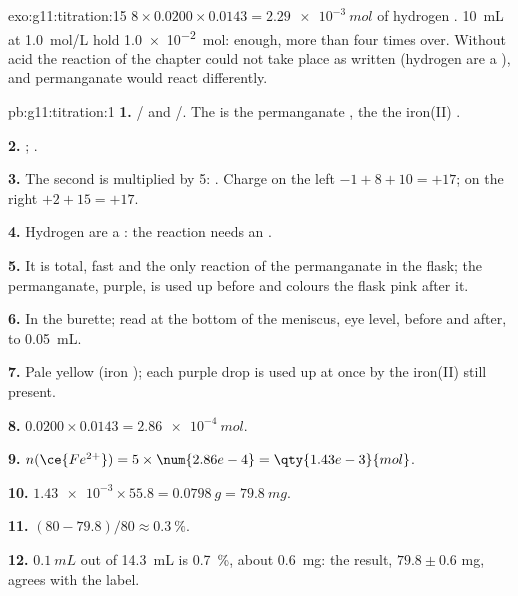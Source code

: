\begin{solution}{exo:g11:titration:15}
$8 \times 0.0200 \times 0.0143 = \qty{2.29e-3}{mol}$ of hydrogen .
\qty{10}{mL} at \qty{1.0}{mol/L} hold \qty{1.0e-2}{mol}: enough, more
than four times over. Without acid the reaction of the chapter could not
take place as written (hydrogen  are a ), and permanganate
would react differently.
\end{solution}

\begin{solution}{pb:g11:titration:1}
\textbf{1.} / and /. The
 is the permanganate , the  the iron(II) .

\textbf{2.} ;
.

\textbf{3.} The second is multiplied by 5:
. Charge on
the left $-1 + 8 + 10 = +17$; on the right $+2 + 15 = +17$.

\textbf{4.} Hydrogen  are a : the reaction needs an .

\textbf{5.} It is total, fast and the only reaction of the permanganate
in the flask; the permanganate, purple, is used up before  and
colours the flask pink after it.

\textbf{6.} In the burette; read at the bottom of the meniscus, eye
level, before and after, to \qty{0.05}{mL}.

\textbf{7.} Pale yellow (iron ); each purple drop is used up at once
by the iron(II)  still present.

\textbf{8.} $0.0200 \times 0.0143 = \qty{2.86e-4}{mol}$.

\textbf{9.} $n(\ce{Fe^{2+}}) = 5 \times \num{2.86e-4} =
\qty{1.43e-3}{mol}$.

\textbf{10.} $\num{1.43e-3} \times 55.8 = \qty{0.0798}{g} =
\qty{79.8}{mg}$.

\textbf{11.} $(80 - 79.8)/80 \approx \qty{0.3}{\percent}$.

\textbf{12.} $\qty{0.1}{mL}$ out of \qty{14.3}{mL} is \qty{0.7}{\percent},
about \qty{0.6}{mg}: the result, $79.8 \pm 0.6$ mg, agrees with the
label.


\end{solution}
